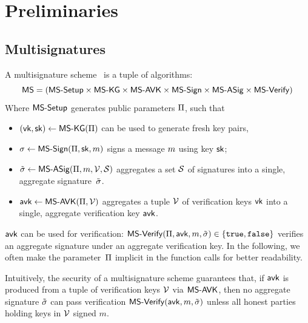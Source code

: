 \section{Preliminaries}\label{sec:prel}

\subsection{Multisignatures}\label{sec:multisig}

A multisignature scheme~\cite{itakura1983public,CCS:MicOhtRey01} is a
tuple of algorithms:
$$
\mathsf{MS} = (\mathsf{MS\textsf{-}{}Setup} \times \allowbreak\mathsf{MS\textsf{-}{}KG} \times \allowbreak\mathsf{MS\textsf{-}{}AVK} \times \allowbreak
\mathsf{MS\textsf{-}{}Sign} \times \allowbreak\mathsf{MS\textsf{-}{}ASig} \times \allowbreak\mathsf{MS\textsf{-}{}Verify})
$$
Where $\mathsf{MS\textsf{-}{}Setup}$ generates public parameters $\Pi$, such that
\begin{itemize}
  \item $(\mathsf{vk},\mathsf{sk}) \gets \mathsf{MS\textsf{-}{}KG}(\Pi)$ can be used to generate fresh key pairs,
  \item $\sigma \gets \mathsf{MS\textsf{-}{}Sign}(\Pi,\mathsf{sk},m)$ signs  a message $m$ using key $\mathsf{sk}$;
  \item $\tilde \sigma \gets \mathsf{MS\textsf{-}{}ASig}(\Pi,m,\mathcal V,\mathcal S)$ aggregates a
    set $\mathcal S$ of signatures into a single, aggregate signature~$\tilde \sigma$.
  \item $\mathsf{avk} \gets \mathsf{MS\textsf{-}{}AVK}(\Pi,\mathcal V)$ aggregates
  a tuple $\mathcal V$ of verification keys $\mathsf{vk}$ into a single,
  aggregate verification key $\mathsf{avk}$.
\end{itemize}
  $\mathsf{avk}$ can be used for verification:
  $\mathsf{MS\textsf{-}{}Verify}(\Pi,\mathsf{avk},m,\tilde \sigma) \in \{\mathtt{true},\mathtt{false}\}$
  verifies an aggregate signature under an aggregate verification key.
  In the following, we often make the parameter~$\Pi$ implicit in the
    function calls for better readability.

  Intuitively, the security of a multisignature scheme guarantees
  that, if $\mathsf{avk}$ is produced from a tuple of verification keys
  $\mathcal V$ via $\mathsf{MS\textsf{-}{}AVK}$, then no aggregate signature $\tilde \sigma$ can
  pass verification $\mathsf{MS\textsf{-}{}Verify}(\mathsf{avk},m,\tilde \sigma)$ unless all
  honest parties holding keys in $\mathcal V$ signed $m$.

